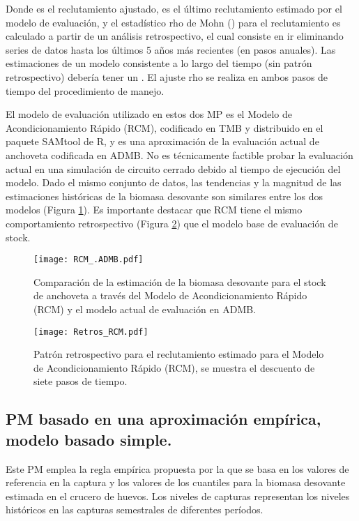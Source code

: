 Donde es el reclutamiento ajustado, es el último reclutamiento estimado por el modelo de evaluación,
y el estadístico rho de Mohn () para el reclutamiento es calculado a partir de un análisis retrospectivo, el
cual consiste en ir eliminando series de datos hasta los últimos 5 años más recientes (en pasos anuales).
Las estimaciones de un modelo consistente a lo largo del tiempo (sin patrón retrospectivo) debería
tener un . El ajuste rho se realiza en ambos pasos de tiempo del procedimiento de manejo.
\newline

El modelo de evaluación utilizado en estos dos MP es el Modelo de Acondicionamiento Rápido (RCM),
codificado en TMB y distribuido en el paquete SAMtool de R, y es una aproximación de la evaluación
actual de anchoveta codificada en ADMB. No es técnicamente factible probar la evaluación actual en
una simulación de circuito cerrado debido al tiempo de ejecución del modelo. Dado el mismo conjunto
de datos, las tendencias y la magnitud de las estimaciones históricas de la biomasa desovante son
similares entre los dos modelos (Figura \ref{fig:RCM_.ADMB}). Es importante destacar que RCM tiene el mismo
comportamiento retrospectivo (Figura \ref{fig:Retros_RCM}) que el modelo base de evaluación de stock.

\begin{figure}[H]
    \centering
    \texttt{[image: RCM\_.ADMB.pdf]}  
    \caption{Comparación de la estimación de la biomasa desovante para el stock de anchoveta a través del
    Modelo de Acondicionamiento Rápido (RCM) y el modelo actual de evaluación en ADMB.}
    \label{fig:RCM_.ADMB}
\end{figure}  

\begin{figure}[H]
    \centering
    \texttt{[image: Retros\_RCM.pdf]}  
    \caption{Patrón retrospectivo para el reclutamiento estimado para el Modelo de Acondicionamiento
    Rápido (RCM), se muestra el descuento de siete pasos de tiempo.}
    \label{fig:Retros_RCM}
\end{figure}  

\subsection{PM basado en una aproximación empírica, modelo basado simple.}

Este PM emplea la regla empírica propuesta por \cite{canales2021empirical} la que se basa en los valores de referencia en la captura y los valores de los cuantiles para la biomasa desovante estimada en el crucero de huevos. Los niveles de capturas representan los niveles históricos en las capturas semestrales de diferentes períodos.
\newline

